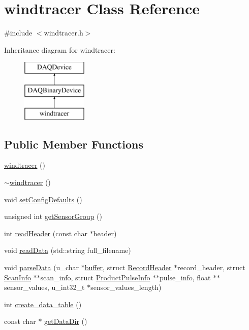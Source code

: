 \hypertarget{classwindtracer}{\section{windtracer Class Reference}
\label{classwindtracer}
}


{\ttfamily \#include $<$windtracer.\-h$>$}

Inheritance diagram for windtracer\-:\begin{figure}[H]
\begin{center}
\leavevmode
\includegraphics[height=3.000000cm]{classwindtracer}
\end{center}
\end{figure}
\subsection*{Public Member Functions}
\begin{DoxyCompactItemize}
\item 
\hyperlink{classwindtracer_a3f39c3cdfe087c887a78a85f7a5bed36}{windtracer} ()
\item 
\hyperlink{classwindtracer_abfca68f0babb9454b1bc6776d8b3940e}{$\sim$windtracer} ()
\item 
void \hyperlink{classwindtracer_a6e14dbde1b75db6e2c995b86964316ea}{set\-Config\-Defaults} ()
\item 
unsigned int \hyperlink{classwindtracer_a55ce8f421fa720fa2f6976feb229f255}{get\-Sensor\-Group} ()
\item 
int \hyperlink{classwindtracer_ae85ea00fe9c7849b4b29e2efe644383c}{read\-Header} (const char $\ast$header)
\item 
void \hyperlink{classwindtracer_a3017c180cdd51ab93c5b73c2f84059f5}{read\-Data} (std\-::string full\-\_\-filename)
\item 
void \hyperlink{classwindtracer_a586683ce39f917f833eb2d1478c5a108}{parse\-Data} (u\-\_\-char $\ast$\hyperlink{classDAQDevice_ab661aa5c5b4bafe78354f5169b1c7d2f}{buffer}, struct \hyperlink{structRecordHeader}{Record\-Header} $\ast$record\-\_\-header, struct \hyperlink{structScanInfo}{Scan\-Info} $\ast$$\ast$scan\-\_\-info, struct \hyperlink{structProductPulseInfo}{Product\-Pulse\-Info} $\ast$$\ast$pulse\-\_\-info, float $\ast$$\ast$sensor\-\_\-values, u\-\_\-int32\-\_\-t $\ast$sensor\-\_\-values\-\_\-length)
\item 
int \hyperlink{classwindtracer_a4921e9eaa0f568b3119bd8f253484388}{create\-\_\-data\-\_\-table} ()
\item 
const char $\ast$ \hyperlink{classwindtracer_abb6a7e64e508dec0f0e10cf8af76fc9c}{get\-Data\-Dir} ()
\end{DoxyCompactItemize}
